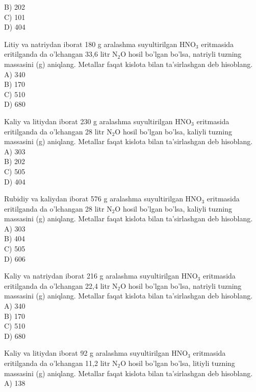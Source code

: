 B) 202\\
C) 101\\
D) 404
  \item Litiy va natriydan iborat 180 g aralashma suyultirilgan $\mathrm{HNO}_{3}$ eritmasida eritilganda da o'lchangan 33,6 litr $\mathrm{N}_{2} \mathrm{O}$ hosil bo'lgan bo'lsa, natriyli tuzning massasini (g) aniqlang. Metallar faqat kislota bilan ta'sirlashgan deb hisoblang.\\
A) 340\\
B) 170\\
C) 510\\
D) 680
  \item Kaliy va litiydan iborat 230 g aralashma suyultirilgan $\mathrm{HNO}_{3}$ eritmasida eritilganda da o'lchangan 28 litr $\mathrm{N}_{2} \mathrm{O}$ hosil bo'lgan bo'lsa, kaliyli tuzning\\
massasini (g) aniqlang. Metallar faqat kislota bilan ta'sirlashgan deb hisoblang.\\
A) 303\\
B) 202\\
C) 505\\
D) 404
  \item Rubidiy va kaliydan iborat 576 g aralashma suyultirilgan $\mathrm{HNO}_{3}$ eritmasida eritilganda da o'lchangan 28 litr $\mathrm{N}_{2} \mathrm{O}$ hosil bo'lgan bo'lsa, kaliyli tuzning massasini (g) aniqlang. Metallar faqat kislota bilan ta'sirlashgan deb hisoblang.\\
A) 303\\
B) 404\\
C) 505\\
D) 606
  \item Kaliy va natriydan iborat 216 g aralashma suyultirilgan $\mathrm{HNO}_{3}$ eritmasida eritilganda da o'lchangan 22,4 litr $\mathrm{N}_{2} \mathrm{O}$ hosil bo'lgan bo'lsa, natriyli tuzning massasini (g) aniqlang. Metallar faqat kislota bilan ta'sirlashgan deb hisoblang.\\
A) 340\\
B) 170\\
C) 510\\
D) 680
  \item Kaliy va litiydan iborat 92 g aralashma suyultirilgan $\mathrm{HNO}_{3}$ eritmasida eritilganda da o'lchangan 11,2 litr $\mathrm{N}_{2} \mathrm{O}$ hosil bo'lgan bo'lsa, litiyli tuzning massasini (g) aniqlang. Metallar faqat kislota bilan ta'sirlashgan deb hisoblang.\\
A) 138\\
